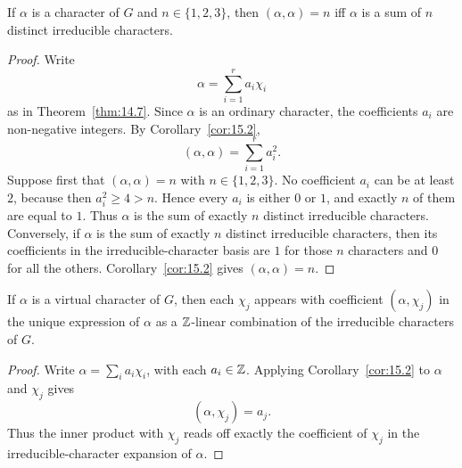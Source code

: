 \documentclass[../Odyssey_Project.tex]{subfiles}
\begin{document}
\begin{corollary}
\label{cor:15.3}
If $\alpha$ is a character of $G$ and $n \in \{1, 2, 3\}$, then $(\alpha, \alpha) = n$ iff $\alpha$ is a sum of $n$ distinct irreducible characters.
\end{corollary}
\begin{proof}
    Write
    \[
        \alpha=\sum_{i=1}^{r}a_i\chi_i
    \]
    as in Theorem~\ref{thm:14.7}. Since $\alpha$ is an ordinary character, the coefficients $a_i$ are non-negative integers. By Corollary~\ref{cor:15.2},
    \[
        (\alpha,\alpha)=\sum_{i=1}^{r}a_i^2.
    \]
    Suppose first that $(\alpha,\alpha)=n$ with $n\in\{1,2,3\}$. No coefficient $a_i$ can be at least $2$, because then $a_i^2\geq4>n$. Hence every $a_i$ is either $0$ or $1$, and exactly $n$ of them are equal to $1$. Thus $\alpha$ is the sum of exactly $n$ distinct irreducible characters.\\
    Conversely, if $\alpha$ is the sum of exactly $n$ distinct irreducible characters, then its coefficients in the irreducible-character basis are $1$ for those $n$ characters and $0$ for all the others. Corollary~\ref{cor:15.2} gives $(\alpha,\alpha)=n$.
\end{proof}

\begin{corollary}
\label{cor:15.4}
If $\alpha$ is a virtual character of $G$, then each $\chi_j$ appears with coefficient $(\alpha, \chi_j)$ in the unique expression of $\alpha$ as a $\mathbb{Z}$-linear combination of the irreducible characters of $G$.
\end{corollary}
\begin{proof}
    Write $\alpha=\sum_i a_i\chi_i$, with each $a_i\in\mathbb{Z}$. Applying Corollary~\ref{cor:15.2} to $\alpha$ and $\chi_j$ gives
    \[
        (\alpha,\chi_j)=a_j.
    \]
    Thus the inner product with $\chi_j$ reads off exactly the coefficient of $\chi_j$ in the irreducible-character expansion of $\alpha$.
\end{proof}
\end{document}
